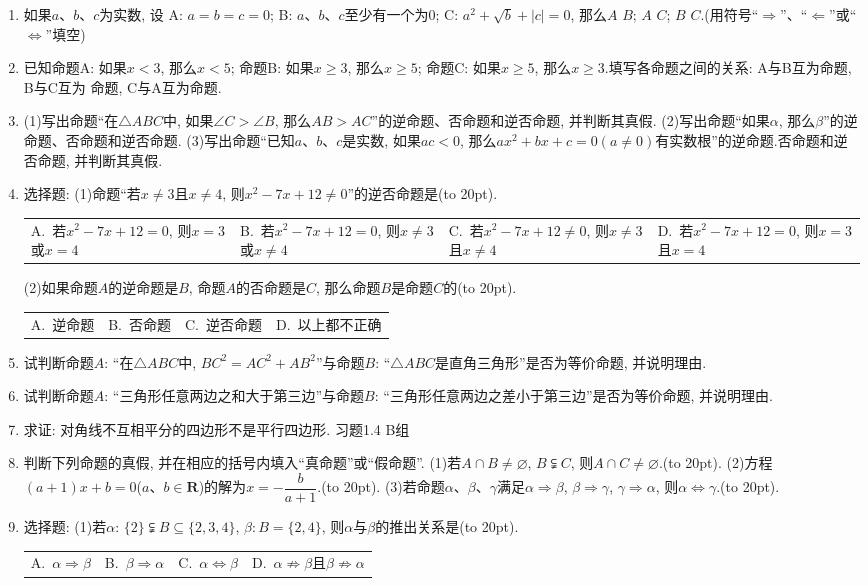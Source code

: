 \documentclass[10pt,a4paper]{article}
\newcommand{\bracket}[1]{(\hbox to #1pt{})}
\newcommand{\fourch}[4]{\par\begin{tabular}{p{.23\textwidth}p{.23\textwidth}p{.23\textwidth}p{.23\textwidth}}
A.~#1 &B.~#2& C.~#3& D.~#4
\end{tabular}}
\begin{document}
\begin{enumerate}[1.]
(2)一组对边平行且两对角线相等的四边形是平行四边形.\bracket{20}.
(3)如果$|a|<2$, 那么$a<2$.\bracket{20}.
(4)如果$A\cap B=A$, 那么$A\cup B=B$.\bracket{20}.
\item 如果$a$、$b$、$c$为实数, 设
A: $a=b=c=0$; B: $a$、$b$、$c$至少有一个为0; C: $a^2+\sqrt b+|c|=0$,
那么$A$   $B$; $A$   $C$; $B$ $C$.(用符号``$\Rightarrow$''、``$\Leftarrow$''或``$\Leftrightarrow$''填空)
\item 已知命题A: 如果$x<3$, 那么$x<5$; 命题B: 如果$x\ge 3$, 那么$x\ge 5$; 命题C: 如果$x\ge 5$, 那么$x\ge 3$.填写各命题之间的关系:
A与B互为命题, B与C互为 命题, C与A互为命题.
\item (1)写出命题``在$\triangle ABC$中, 如果$\angle C>\angle B$, 那么$AB>AC$''的逆命题、否命题和逆否命题, 并判断其真假.
(2)写出命题``如果$\alpha$, 那么$\beta$''的逆命题、否命题和逆否命题.
(3)写出命题``已知$a$、$b$、$c$是实数, 如果$ac<0$, 那么$ax^2+bx+c=0(a\ne 0)$有实数根''的逆命题.否命题和逆否命题, 并判断其真假.
\item 选择题:
(1)命题``若$x\ne 3$且$x\ne 4$, 则$x^2-7x+12\ne 0$''的逆否命题是\bracket{20}.
\fourch{若$x^2-7x+12=0$, 则$x=3$或$x=4$}{若$x^2-7x+12=0$, 则$x\ne 3$或$x\ne 4$}{若$x^2-7x+12\ne 0$, 则$x\ne 3$且$x\ne 4$}{若$x^2-7x+12=0$, 则$x=3$且$x=4$}
(2)如果命题$A$的逆命题是$B$, 命题$A$的否命题是$C$, 那么命题$B$是命题$C$的\bracket{20}.
\fourch{逆命题}{否命题}{逆否命题}{以上都不正确}
\item 试判断命题$A$: ``在$\triangle ABC$中, $BC^2=AC^2+AB^2$''与命题$B$: ``$\triangle ABC$是直角三角形''是否为等价命题, 并说明理由.
\item 试判断命题$A$: ``三角形任意两边之和大于第三边''与命题$B$: ``三角形任意两边之差小于第三边''是否为等价命题, 并说明理由.
\item 求证: 对角线不互相平分的四边形不是平行四边形.
习题1.4  B组
\item 判断下列命题的真假, 并在相应的括号内填入``真命题''或``假命题''.
(1)若$A\cap B\ne \varnothing$, $B\subsetneqq C$, 则$A\cap C\ne \varnothing$.\bracket{20}.
(2)方程$(a+1)x+b=0$($a$、$b\in \mathbf{R}$)的解为$x=-\dfrac b{a+1}$.\bracket{20}.
(3)若命题$\alpha$、$\beta$、$\gamma$满足$\alpha \Rightarrow \beta$, $\beta \Rightarrow \gamma$, $\gamma \Rightarrow \alpha$, 则$\alpha \Leftrightarrow \gamma$.\bracket{20}.
\item 选择题:
(1)若$\alpha$: $\{2\}\subsetneqq B\subseteq \{2,3,4\}$, $\beta :B=\{2,4\}$, 则$\alpha$与$\beta$的推出关系是\bracket{20}.
\fourch{$\alpha \Rightarrow \beta$}{$\beta \Rightarrow \alpha$}{$\alpha \Leftrightarrow \beta$}{$\alpha \not\Rightarrow \beta$且$\beta \not\Rightarrow \alpha$}

\end{enumerate}
\end{document}
